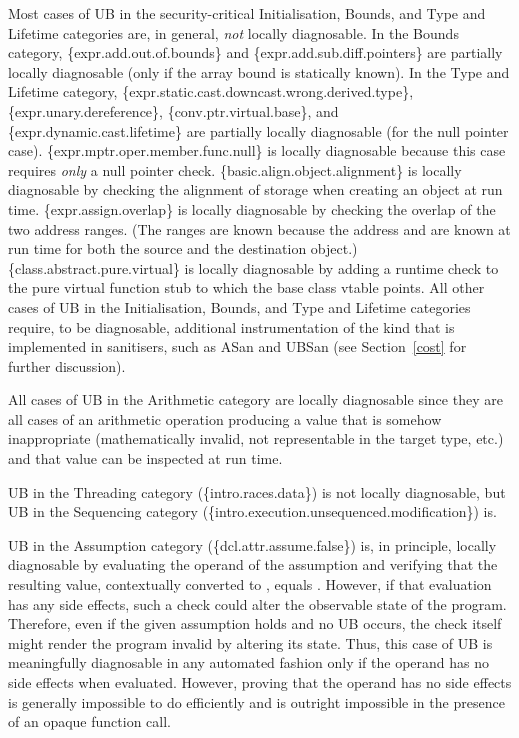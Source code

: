 Most cases of UB in the security-critical Initialisation, Bounds, and Type and Lifetime categories are, in general, \emph{not} locally diagnosable.  In the Bounds category, 
\{expr.add.out.of.bounds\} 
and \{expr.add.sub.diff.pointers\} 
are partially locally diagnosable (only if the array bound is statically known). In the Type and Lifetime category,
\{expr.static.cast.downcast.wrong.derived.type\},
\{expr.unary.dereference\}, 
\{conv.ptr.virtual.base\}, and
\{expr.dynamic.cast.lifetime\}
are partially locally diagnosable (for the null pointer case).
\{expr.mptr.oper.member.func.null\} is locally diagnosable because this case requires \emph{only} a null pointer check.
\{basic.align.object.alignment\} is locally diagnosable by checking the alignment of storage when creating an object at run time.
\{expr.assign.overlap\} is locally diagnosable by checking the overlap of the two address ranges. (The ranges are known because the address and  are known at run time for both the source and the destination object.) \{class.abstract.pure.virtual\} is locally diagnosable by adding a runtime check to  the pure virtual function stub to which the base class vtable points. All other cases of UB in the Initialisation, Bounds, and Type and Lifetime categories require, to be diagnosable, additional instrumentation of the kind that is implemented in sanitisers, such as ASan and UBSan (see Section~\ref{cost} for further discussion).

All cases of UB in the Arithmetic category are locally diagnosable since they are all cases of an arithmetic operation producing a value that is somehow inappropriate (mathematically invalid, not representable in the target type, etc.) and that value can be inspected at run time.

UB in the Threading category (\{intro.races.data\}) is not locally diagnosable, but UB in the Sequencing category (\{intro.execution.unsequenced.modification\}) is. 

UB in the Assumption category (\{dcl.attr.assume.false\}) is, in principle, locally diagnosable by evaluating the operand of the assumption and verifying that the resulting value, contextually converted to , equals . However, if that evaluation has any side effects, such a check could alter the observable state of the program. Therefore, even if the given assumption holds and no UB occurs, the check itself might render the program invalid by altering its state. Thus, this case of UB is  meaningfully diagnosable in any automated fashion only if the operand has no side effects when evaluated. However, proving that the operand has no side effects is generally impossible to do efficiently and is outright impossible in the presence of an opaque function call.

